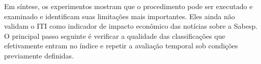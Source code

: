 Em síntese, os experimentos mostram que o procedimento pode ser executado e examinado e identificam suas limitações mais importantes. Eles ainda não validam o ITI como indicador de impacto econômico das notícias sobre a Sabesp. O principal passo seguinte é verificar a qualidade das classificações que efetivamente entram no índice e repetir a avaliação temporal sob condições previamente definidas.
